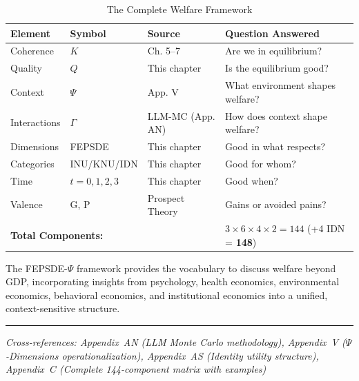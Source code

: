 \begin{table}[htbp]
\centering
\caption{The Complete Welfare Framework}
\label{tab:complete-framework}
\renewcommand{\arraystretch}{1.4}
\begin{tabular}{@{}llll@{}}
\toprule
\textbf{Element} & \textbf{Symbol} & \textbf{Source} & \textbf{Question Answered} \\
\midrule
Coherence & $K$ & Ch. 5--7 & Are we in equilibrium? \\
Quality & $Q$ & This chapter & Is the equilibrium good? \\
Context & $\Psi$ & App. V & What environment shapes welfare? \\
Interactions & $\Gamma$ & LLM-MC (App. AN) & How does context shape welfare? \\
Dimensions & FEPSDE & This chapter & Good in what respects? \\
Categories & INU/KNU/IDN & This chapter & Good for whom? \\
Time & $t = 0,1,2,3$ & This chapter & Good when? \\
Valence & G, P & Prospect Theory & Gains or avoided pains? \\
\midrule
\multicolumn{3}{l}{\textbf{Total Components:}} & $3 \times 6 \times 4 \times 2 = 144$ (+4 IDN = \textbf{148}) \\
\bottomrule
\end{tabular}
\end{table}

The FEPSDE-$\Psi$ framework provides the vocabulary to discuss welfare
beyond GDP, incorporating insights from psychology, health economics,
environmental economics, behavioral economics, and institutional economics
into a unified, context-sensitive structure.

\begin{center}
\end{center}

\vspace{1em}
\hrule
\vspace{0.5em}
\noindent\textit{Cross-references: Appendix~AN (LLM Monte Carlo methodology), 
Appendix~V ($\Psi$-Dimensions operationalization), 
Appendix~AS (Identity utility structure),
Appendix~C (Complete 144-component matrix with examples)}

